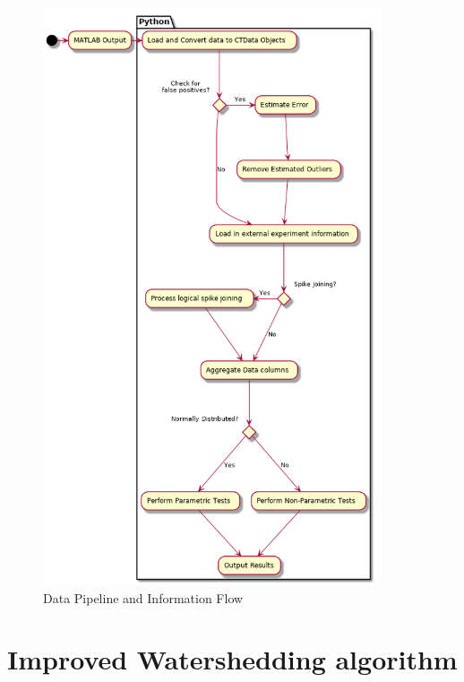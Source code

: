 \documentclass[11pt]{report}
\begin{document}
\begin{center}
\begin{figure}[htb]
\centering
\includegraphics[width=10cm]{./images/pipeline.png}
\caption{\label{fig:pipeline}Data Pipeline and Information Flow}
\end{figure}
\end{center}

\section{Improved Watershedding algorithm}
\label{sec-3-2}
\end{document}
